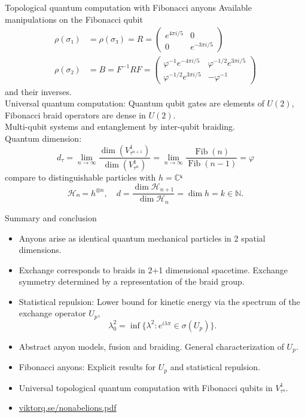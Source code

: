 \documentclass{beamer}
\newcommand\op{\operatorname}
\begin{document}
\begin{frame}{Topological quantum computation with Fibonacci anyons}
  Available manipulations on the Fibonacci qubit
  \begin{align*}
    ρ(σ₁) &= ρ(σ₃) = R =
    \begin{pmatrix}
      e^{4πi/5} & 0 \\
      0 & e^{-3πi/5}
    \end{pmatrix} \\
    ρ(σ₂) &= B = F^{-1} R F =
    \begin{pmatrix}
      φ^{-1} e^{-4πi/5} & φ ^{-1/2} e^{3πi/5} \\
      φ^{-1/2} e^{3πi/5} & -φ^{-1}
    \end{pmatrix}
  \end{align*}
  and their inverses.\\
  \pause
  Universal quantum computation: Quantum qubit gates are elements of $U(2)$, Fibonacci braid operators are dense in $U(2)$.\\
  \pause
  Multi-qubit systems and entanglement by inter-qubit braiding.\\
  \pause
  Quantum dimension:
  \begin{equation*}
    d_\tau = \lim_{n\to\infty} \frac{\op{dim}\left( V^1_{\tau^{n+1}} \right)}{\op{dim}\left( V^1_{\tau^{n}} \right)}
    = \lim_{n\to\infty} \frac{\op{Fib}(n)}{\op{Fib}(n-1)} = \varphi
  \end{equation*}
  compare to distinguishable particles with $h = ℂᵏ$
  \begin{equation*}
    ℋₙ = h^{⊗n}, \quad d = \frac{\op{dim} ℋ_{n+1}}{\op{dim}ℋ_{n}} = \op{dim} h = k ∈ ℕ.
  \end{equation*}
\end{frame}








\begin{frame}{Summary and conclusion}
  \begin{itemize}
    \pause
    \item Anyons arise as identical quantum mechanical particles in 2 spatial dimensions.
    \pause
    \item Exchange corresponds to braids in 2+1 dimensional spacetime. Exchange symmetry determined by a representation of the braid group.
    \pause
    \item Statistical repulsion: Lower bound for kinetic energy via the spectrum of the exchange operator $U_p$, \[ λ_0^2 = \inf \{ λ^2 : e^{iλπ} ∈ σ(U_p) \}. \] \vspace{-1.5em}
    \pause
    \item Abstract anyon models, fusion and braiding. General characterization of $U_p$.
    \pause
    \item Fibonacci anyons: Explicit results for $U_p$ and statistical repulsion.
    \pause
    \item Universal topological quantum computation with Fibonacci qubits in $V_{τ^4}^1$.
    \pause
    \item \url{viktorq.se/nonabelions.pdf}
  \end{itemize}
\end{frame}
\end{document}
